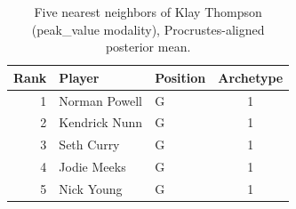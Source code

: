 \begin{table}[htbp]
  \centering\small
  \begin{tabular}{rllc}
    \toprule
    Rank & Player & Position & Archetype \\
    \midrule
    1 & Norman Powell & G & 1 \\
    2 & Kendrick Nunn & G & 1 \\
    3 & Seth Curry & G & 1 \\
    4 & Jodie Meeks & G & 1 \\
    5 & Nick Young & G & 1 \\
    \bottomrule
  \end{tabular}
  \caption{Five nearest neighbors of Klay Thompson (peak_value modality), Procrustes-aligned posterior mean.}
  \label{tab:Klay_Thompson_neighbors_peak_value}
\end{table}

